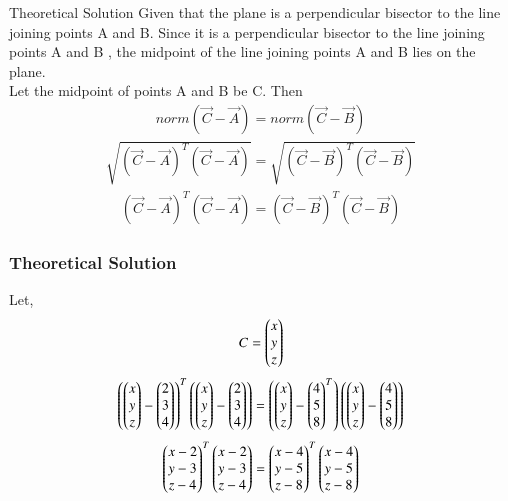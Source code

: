 \documentclass{beamer}
\begin{document}
\begin{frame}{Theoretical Solution}
Given that the plane is a perpendicular bisector to the line joining points A and B. Since it is a perpendicular bisector to the line joining points A and B , the midpoint of the line joining points A and B lies on the plane.\\
Let the midpoint of points A and B be C. Then
\begin{align}
norm({\Vec{C}-\Vec{A}})=norm({\Vec{C}-\Vec{B}})
\end{align}
\begin{align}
    \sqrt{(\Vec{C}-\Vec{A})^T(\Vec{C}-\Vec{A})}=\sqrt{(\Vec{C}-\Vec{B})^T(\Vec{C}-\Vec{B})}
\end{align}
\begin{align}
    (\Vec{C}-\Vec{A})^T(\Vec{C}-\Vec{A})=(\Vec{C}-\Vec{B})^T(\Vec{C}-\Vec{B})
\end{align}


\end{frame}
\begin{frame}
\frametitle{Theoretical Solution}
Let,
\begin{align}
    C=\begin{pmatrix}x \\ y \\ z\end{pmatrix}
\end{align}
\begin{align}
    \left(\begin{pmatrix}x \\ y \\ z\end{pmatrix}-\begin{pmatrix}2\\3\\4\end{pmatrix}\right)^T\left(\begin{pmatrix}x \\ y \\ z\end{pmatrix}-\begin{pmatrix}2\\3\\4\end{pmatrix}\right)=\left(\begin{pmatrix}x \\ y \\ z\end{pmatrix}-\begin{pmatrix}4\\5\\8\end{pmatrix}^T\right)\left(\begin{pmatrix}x \\ y \\ z\end{pmatrix}-\begin{pmatrix}4\\5\\8\end{pmatrix}\right)
\end{align}
\begin{align}
    \begin{pmatrix}x-2\\y-3\\z-4\end{pmatrix}^T\begin{pmatrix}x-2\\y-3\\z-4\end{pmatrix}=\begin{pmatrix}x-4\\y-5\\z-8\end{pmatrix}^T\begin{pmatrix}x-4\\y-5\\z-8\end{pmatrix}
\end{align}


\end{frame}
\end{document}
